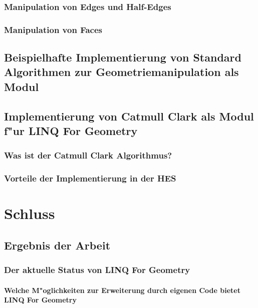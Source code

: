\documentclass[pagesize, paper=a4, fontsize=12pt,titlepage=true, headings=small, headnosepline, abstractoff, liststotoc, nochapterprefix, plainheadsepline]{scrreprt}
\newcommand{\LFG}{LINQ For Geometry}
\begin{document}
		\subsection {Manipulation von Edges und Half-Edges}
		\subsection {Manipulation von Faces}
	\section {Beispielhafte Implementierung von Standard Algorithmen zur Geometriemanipulation als Modul}
	\section {Implementierung von Catmull Clark als Modul f"ur \LFG}
		\subsection {Was ist der Catmull Clark Algorithmus?}
		\subsection {Vorteile der Implementierung in der HES}





\chapter {Schluss}
	\section {Ergebnis der Arbeit}
		\subsection {Der aktuelle Status von \LFG}
			\subsubsection {Welche M"oglichkeiten zur Erweiterung durch eigenen Code bietet \LFG}
\end{document}
